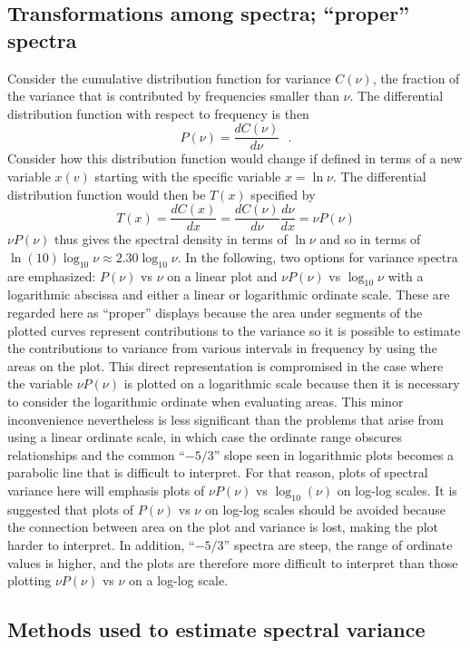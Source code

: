 \documentclass[12pt,english]{report}\usepackage[]{graphicx}\usepackage[]{color}
\begin{document}
\subsection{Transformations among spectra; ``proper'' spectra}

Consider the cumulative distribution function for variance $C(\nu)$,
the fraction of the variance that is contributed by frequencies smaller
than $\nu$. The differential distribution function with respect to
frequency is then
\[
P(\nu)=\frac{dC(\nu)}{d\nu}\,\,\,\,.
\]
Consider how this distribution function would change if defined in
terms of a new variable $x(v)$ starting with the specific variable
$x=\ln\nu$. The differential distribution function would then be
$T(x)$ specified by\\
\[
T(x)=\frac{dC(x)}{dx}=\frac{dC(\nu)}{d\nu}\frac{d\nu}{dx}=\nu P(\nu)
\]
$\nu P(\nu)$ thus gives the spectral density in terms of $\ln\nu$
and so in terms of $\ln(10)\log_{10}\nu\approx2.30\log_{10}\nu$.
In the following, two options for variance spectra are emphasized:
$P(\nu)$ vs $\nu$ on a linear plot and $\nu P(\nu)$ vs $\log_{10}\nu$
with a logarithmic abscissa and either a linear or logarithmic ordinate
scale. These are regarded here as ``proper'' displays because the
area under segments of the plotted curves represent contributions
to the variance so it is possible to estimate the contributions to
variance from various intervals in frequency by using the areas on
the plot. This direct representation is compromised in the case where
the variable $\nu P(\nu)$ is plotted on a logarithmic scale because
then it is necessary to consider the logarithmic ordinate when evaluating
areas. This minor inconvenience nevertheless is less significant than
the problems that arise from using a linear ordinate scale, in which
case the ordinate range obscures relationships and the common ``$-5/3$''
slope seen in logarithmic plots becomes a parabolic line that is difficult
to interpret. For that reason, plots of spectral variance here will
emphasis plots of $\nu P(\nu)$ vs $\log_{10}(\nu)$ on log-log scales.
It is suggested that plots of $P(\nu)$ vs $\nu$ on log-log scales
should be avoided because the connection between area on the plot
and variance is lost, making the plot harder to interpret. In addition,
``$-5/3$'' spectra are steep, the range of ordinate values is higher,
and the plots are therefore more difficult to interpret than those
plotting $\nu P(\nu)$ vs $\nu$ on a log-log scale.

\subsection{Methods used to estimate spectral variance}
\end{document}
